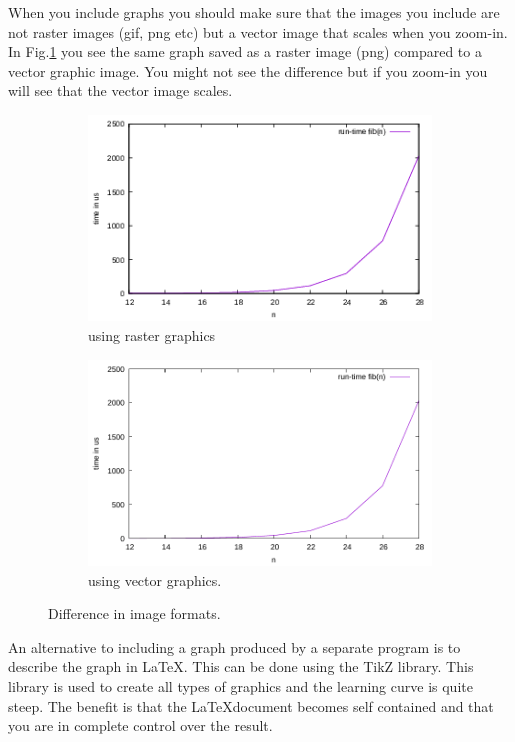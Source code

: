 \documentclass[a4paper,11pt]{article}
\begin{document}
When you include graphs you should make sure that the images you
include are not raster images (gif, png etc) but a vector image that
scales when you zoom-in. In Fig.\ref{fig:images} you see the same
graph saved as a raster image (png) compared to a vector graphic
image. You might not see the difference but if you zoom-in you will
see that the vector image scales.

\begin{figure}[h]
  \centering
  \begin{subfigure}{.5\textwidth}
    \centering
    \includegraphics[scale=0.45]{fib.png}
    \caption{using raster graphics}
  \end{subfigure}%
  \begin{subfigure}{.5\textwidth}
    \centering
    \includegraphics[scale=0.45]{fib.pdf}
    \caption{using vector graphics.}
  \end{subfigure}
  \caption{Difference in image formats.}
  \label{fig:images}
\end{figure}

An alternative to including a graph produced by a separate program is
to describe the graph in \LaTeX. This can be done using the TikZ
library. This library is used to create all types of graphics and the
learning curve is quite steep. The benefit is that the \LaTeX document
becomes self contained and that you are in complete control over the result.
\end{document}

